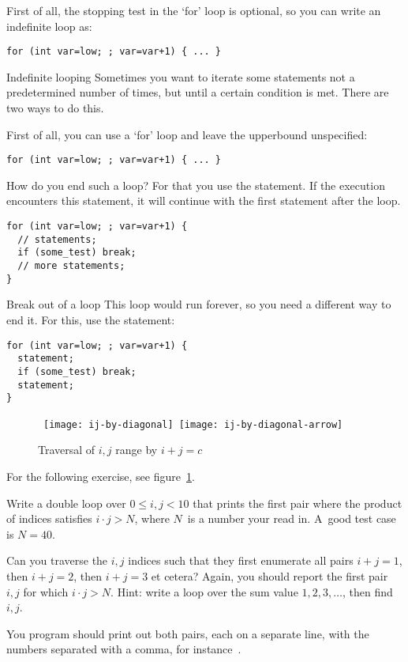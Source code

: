 First of all, the stopping test in the `for' loop is optional, so you
can write an indefinite loop as:
\begin{verbatim}
for (int var=low; ; var=var+1) { ... }
\end{verbatim}

\begin{slide}{Indefinite looping}
  \label{sl:for-inf}
  Sometimes you want to iterate some statements not a predetermined
  number of times, but until a certain condition is met. There are two
  ways to do this.

  First of all, you can use a `for' loop and leave the upperbound
  unspecified:
\begin{verbatim}
for (int var=low; ; var=var+1) { ... }
\end{verbatim}
\end{slide}

How do you end such a loop? For that you use the
 statement. If the execution encounters this
statement, it will continue with the first statement after the loop.

\begin{verbatim}
for (int var=low; ; var=var+1) {
  // statements;
  if (some_test) break;
  // more statements;
}
\end{verbatim}

\begin{slide}{Break out of a loop}
  \label{sl:for-break}
  This loop would run forever, so you need a different way to end
  it. For this, use the  statement:
\begin{verbatim}
for (int var=low; ; var=var+1) {
  statement;
  if (some_test) break;
  statement;
}
\end{verbatim}
\end{slide}

\ifIncludeAnswers
\vfill\eject
\fi

\begin{figure}[ht]
  \hbox\bgroup
  \texttt{[image: ij-by-diagonal]}
  \texttt{[image: ij-by-diagonal-arrow]}
  \egroup
  \caption{Traversal of $i,j$ range by $i+j=c$}
  \label{fig:ij-diag}
\end{figure}

For the following exercise, see figure~\ref{fig:ij-diag}.

\begin{exercise}
  \label{ex:ij-product}
  Write a double loop over $0\leq i,j<10$ that prints the first pair
  where the product of indices satisfies $i\cdot j> N$, where $N$~is a
  number your read in. A~good test case is $N=40$.

  Can you traverse the $i,j$ indices such that they first enumerate
  all pairs $i+j=1$, then $i+j=2$, then $i+j=3$ et cetera? Again, you
  should report the first pair $i,j$ for which $i\cdot j>N$. Hint:
  write a loop over the sum value $1,2,3,\ldots$, then find~$i,j$.

  You program should print out both pairs, each on a separate line,
  with the numbers separated with a comma, for instance~.
\end{exercise}

